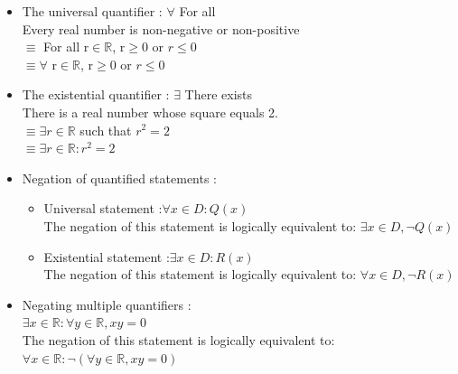 \documentclass{article}
\begin{document}
\begin{itemize} %
\item The universal quantifier : $\forall$ For all\\
Every real number is non-negative or non-positive \\
$\equiv$ For all r$\in \mathbb{R}$, r$ \geq 0 $ or $r \leq 0$\\
$\equiv \forall$ r$\in \mathbb{R}$, r$ \geq 0 $ or $r \leq 0$


\item The existential quantifier : $\exists$ There exists\\
There is a real number whose square equals 2.\\
$\equiv \exists r \in \mathbb{R}$ such that $r^2 = 2$\\
$\equiv \exists r \in \mathbb{R} : r^2 = 2$


\item Negation of quantified statements : 


\begin{itemize}
\item Universal statement :$\forall x \in D : Q(x)$\\
The negation of this statement is logically equivalent to: $\exists x \in D,\neg Q(x)$


\item Existential statement :$\exists x \in D : R(x)$\\
The negation of this statement is logically equivalent to: $\forall x \in D , \neg R(x)$
\end{itemize}



\item Negating multiple quantifiers : \\
$\exists x \in \mathbb{R} : \forall y \in \mathbb{R} ,  xy = 0$ \\
The negation of this statement is logically equivalent to: \\ $\forall x \in \mathbb{R} : \neg  (\forall y \in \mathbb{R} ,  xy = 0)$


\end{itemize}
\end{document}
